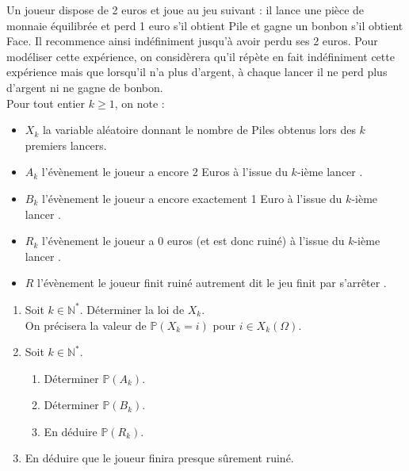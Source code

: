 \documentclass[../PolyS4.tex]{subfiles}
\begin{document}
\newpage



Un joueur dispose de 2 euros et joue au jeu suivant : il lance une pièce de monnaie équilibrée et perd 1 euro s'il obtient Pile et gagne un bonbon s'il obtient Face. Il recommence ainsi indéfiniment jusqu'à avoir perdu ses 2 euros. Pour modéliser cette expérience, on considèrera qu'il répète en fait indéfiniment cette expérience mais que lorsqu'il n'a plus d'argent, à chaque lancer il ne perd plus d'argent ni ne gagne de bonbon.\\

Pour tout entier $k \geq 1$, on note :
\begin{itemize}
    \item $X_k$ la variable aléatoire donnant le nombre de Piles obtenus lors des $k$ premiers lancers.
    \item $A_k$ l'évènement \og  le joueur a encore 2 Euros à l'issue du $k$-ième lancer \fg{} .
    \item $B_k$ l'évènement \og  le joueur a encore exactement 1 Euro à l'issue du $k$-ième lancer \fg{} .
    \item $R_k$ l'évènement \og  le joueur a 0 euros (et est donc ruiné) à l'issue du $k$-ième lancer \fg{} .
    \item $R$ l'évènement \og  le joueur finit ruiné \fg{}  autrement dit \og  le jeu finit par s'arrêter \fg{} .
\end{itemize}

\begin{enumerate}
    \item Soit $k \in \mathbb{N}^*$. Déterminer la loi de $X_k$.\\
     On précisera la valeur de $\mathbb{P}(X_k = i)$ pour $i \in X_k(\Omega)$.
    \item Soit $k \in \mathbb{N}^*$.
    \begin{enumerate}
        \item Déterminer $\mathbb{P}(A_k)$.
        \item Déterminer $\mathbb{P}(B_k)$.
        \item En déduire $\mathbb{P}(R_k)$.
    \end{enumerate}
    \item En déduire que le joueur finira presque sûrement ruiné.
\end{enumerate}




\end{document}
